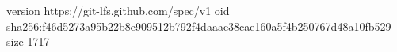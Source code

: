 version https://git-lfs.github.com/spec/v1
oid sha256:f46d5273a95b22b8e909512b792f4daaae38cae160a5f4b250767d48a10fb529
size 1717
